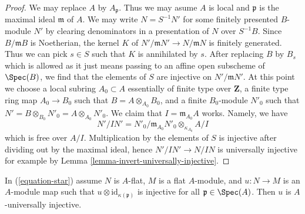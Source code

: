 \begin{proof}
We may replace $A$ by $A_\mathfrak p$. Thus we may asume $A$ is
local and $\mathfrak p$ is the maximal ideal $\mathfrak m$ of $A$.
We may write $N = S^{-1}N'$ for some finitely presented $B$-module $N'$
by clearing denominators in a presentation of $N$ over $S^{-1}B$.
Since $B/\mathfrak m B$ is Noetherian, the kernel $K$ of
$N'/\mathfrak m N' \to N/\mathfrak m N$ is finitely generated.
Thus we can pick $s \in S$ such that $K$ is annihilated by $s$.
After replacing $B$ by $B_s$ which is allowed as it just means passing
to an affine open subscheme of $\Spec(B)$, we find that the elements of $S$
are injective on $N'/\mathfrak m N'$. At this point we choose
a local subring $A_0 \subset A$ essentially of finite type over $\mathbf{Z}$,
a finite type ring map $A_0 \to B_0$ such that $B = A \otimes_{A_0} B_0$,
and a finite $B_0$-module $N'_0$ such that
$N' = B \otimes_{B_0} N'_0 = A \otimes_{A_0} N'_0$.
We claim that $I = \mathfrak m_{A_0} A$ works.
Namely, we have
$$
N'/IN' = N'_0/\mathfrak m_{A_0} N'_0 \otimes_{\kappa_{A_0}} A/I
$$
which is free over $A/I$. Multiplication by the elements of $S$
is injective after dividing out by the maximal ideal, hence
$N'/IN' \to N/IN$ is universally injective for example by
Lemma \ref{lemma-invert-universally-injective}.
\end{proof}

\begin{lemma}
\label{lemma-universally-injective-if-flat}
In (\ref{equation-star}) assume $N$ is $A$-flat, $M$ is a flat $A$-module,
and $u : N \to M$ is an $A$-module map such that
$u \otimes \text{id}_{\kappa(\mathfrak p)}$ is injective for all
$\mathfrak p \in \Spec(A)$. Then $u$ is $A$-universally injective. 
\end{lemma}


